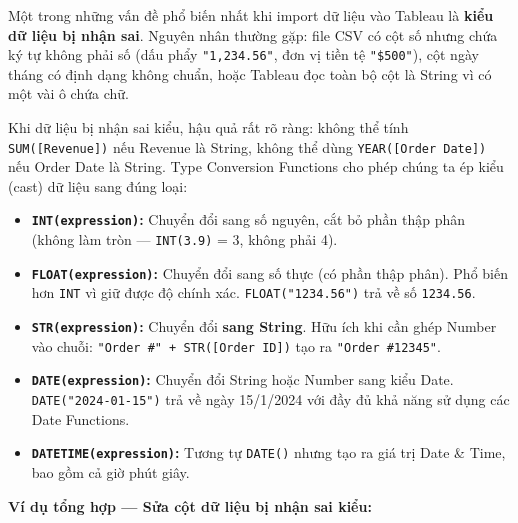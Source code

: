 \documentclass[12pt]{article}
\begin{document}
\noindent Một trong những vấn đề phổ biến nhất khi import dữ liệu vào Tableau là \textbf{kiểu dữ liệu bị nhận sai}. Nguyên nhân thường gặp: file CSV có cột số nhưng chứa ký tự không phải số (dấu phẩy \texttt{"1,234.56"}, đơn vị tiền tệ \texttt{"\$500"}), cột ngày tháng có định dạng không chuẩn, hoặc Tableau đọc toàn bộ cột là String vì có một vài ô chứa chữ.

\noindent Khi dữ liệu bị nhận sai kiểu, hậu quả rất rõ ràng: không thể tính \texttt{SUM([Revenue])} nếu Revenue là String, không thể dùng \texttt{YEAR([Order Date])} nếu Order Date là String. Type Conversion Functions cho phép chúng ta ép kiểu (cast) dữ liệu sang đúng loại:

\begin{itemize}
    \item \textbf{\texttt{INT(expression)}:} Chuyển đổi sang số nguyên, cắt bỏ phần thập phân (không làm tròn --- \texttt{INT(3.9)} = 3, không phải 4).

    \item \textbf{\texttt{FLOAT(expression)}:} Chuyển đổi sang số thực (có phần thập phân). Phổ biến hơn \texttt{INT} vì giữ được độ chính xác. \texttt{FLOAT("1234.56")} trả về số \texttt{1234.56}.

    \item \textbf{\texttt{STR(expression)}:} Chuyển đổi \textbf{sang String}. Hữu ích khi cần ghép Number vào chuỗi: \texttt{"Order \#" + STR([Order ID])} tạo ra \texttt{"Order \#12345"}.

    \item \textbf{\texttt{DATE(expression)}:} Chuyển đổi String hoặc Number sang kiểu Date. \texttt{DATE("2024-01-15")} trả về ngày 15/1/2024 với đầy đủ khả năng sử dụng các Date Functions.

    \item \textbf{\texttt{DATETIME(expression)}:} Tương tự \texttt{DATE()} nhưng tạo ra giá trị Date \& Time, bao gồm cả giờ phút giây.
\end{itemize}

\noindent \textbf{Ví dụ tổng hợp --- Sửa cột dữ liệu bị nhận sai kiểu:}

\begin{aivncodebox}[]
\end{aivncodebox}
\end{document}
